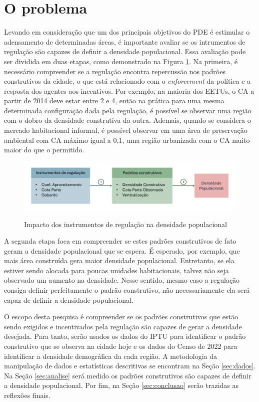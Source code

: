 \section{O problema}

Levando em consideração que um dos principais objetivos do PDE é estimular o adensamento de determinadas áreas, é importante avaliar se os intrumentos de regulação são capazes de definir a densidade populacional. Essa avaliação pode ser dividida em duas etapas, como demonstrado na Figura \ref{fig:proposta}. Na primeira, é necessário compreender se a regulação encontra repercussão nos padrões construtivos da cidade, o que está relacionado com o \textit{enforcement} da política e a resposta dos agentes aos incentivos. Por exemplo, na maioria dos EETUs, o CA a partir de 2014 deve estar entre 2 e 4, então na prática para uma mesma determinada configuração dada pela regulação, é possível se observar uma região com o dobro da densidade construtiva da outra. Ademais, quando se considera o mercado habitacional informal, é possível observar em uma área de preservação ambiental com CA máximo igual a 0,1, uma região urbanizada com o CA muito maior do que o permitido.

\begin{figure}[h]
    \centering
    \caption{Impacto dos instrumentos de regulação na densidade populacional}
    \includegraphics[width = \linewidth]{imagens/desenho_proposta.pdf}
    \label{fig:proposta}
\end{figure}

A segunda etapa foca em compreender se estes padrões construtivos de fato geram a densidade populacional que se espera. É esperado, por exemplo, que mais área construída gera maior densidade populacional. Entretanto, se ela estiver sendo alocada para poucas unidades habitacionais, talvez não seja observado um aumento na densidade. Nesse sentido, mesmo caso a regulação consiga definir perfeitamente o padrão construtivo, não necessariamente ela será capaz de definir a densidade populacional.

O escopo desta pesquisa é compreender se os padrões construtivos que estão sendo exigidos e incentivados pela regulação são capazes de gerar a densidade desejada. Para tanto, serão usados os dados do IPTU para identificar o padrão construtivo que se observa na cidade hoje e os dados do Censo de 2022 para identificar a densidade demográfica da cada região. A metodologia da manipulação de dados e estatísticas descritivas se encontram na Seção \ref{sec:dados}. Na Seção \ref{sec:analise} será medido os padrões construtivos são capazes de definir a densidade populacional. Por fim, na Seção \ref{sec:conclusao} serão trazidas as reflexões finais.


